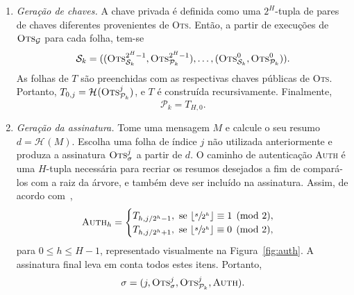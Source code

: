 \documentclass{ufsctex/ufsctex}
\newcommand{\pk}{\mathcal{P}_{k}}
\newcommand{\sk}{\mathcal{S}_{k}}
\newcommand{\hash}[2][]{\mathcal{H}^{#1} (#2)}
\begin{document}
\begin{enumerate}

  \item[] \emph{Geração de chaves.} A chave privada é definida como uma
      $2^{H}$-tupla de pares de chaves diferentes provenientes de \textsc{Ots}.
        Então, a partir de execuções de $\textsc{Ots}_\mathcal{G}$ para cada
        folha, tem-se
        \begin{equation}
          \sk{} = ((\textsc{Ots}_{\sk{}}^{2^{H} - 1},
            \textsc{Ots}_{\pk{}}^{2^{H} - 1}), \dots,
            (\textsc{Ots}_{\sk{}}^{0}, \textsc{Ots}_{\pk{}}^{0})).
        \end{equation}
        As folhas de $T$ são preenchidas com as respectivas chaves públicas de
        \textsc{Ots}. Portanto, $T_{0, j} = \hash{\textsc{Ots}_{\pk{}}^{j}}$, e
        $T$ é construída recursivamente. Finalmente,
        \begin{equation}
          \pk{} = T_{H, 0}.
        \end{equation}

  \item[] \emph{Geração da assinatura.} Tome uma mensagem $M$ e calcule o seu
      resumo $d = \hash{M}$. Escolha uma folha de índice $j$ não utilizada
        anteriormente e produza a assinatura $\textsc{Ots}_\sigma^{j}$ a partir
        de $d$. O caminho de autenticação \textsc{Auth} é uma $H$-tupla
        necessária para recriar os resumos desejados a fim de compará-los com a
        raiz da árvore, e também deve ser incluído na assinatura. Assim, de
        acordo com~\cite[pp. 43]{Bernstein:book:2008},
        \begin{equation}
          \textsc{Auth}_{h} =
          \begin{cases}
            T_{h, j / 2^{h}  - 1}, \text{ se }
              \lfloor \sfrac{s}{2^{h}} \rfloor \equiv 1 \pmod{2}, \\
            T_{h, j / 2^{h}  + 1}, \text{ se }
              \lfloor \sfrac{s}{2^{h}} \rfloor \equiv 0 \pmod{2},
          \end{cases}
        \end{equation}
        para $0 \leq h \leq H - 1$, representado visualmente na
        Figura~\ref{fig:auth}. A assinatura final leva em conta todos estes
        itens. Portanto,
        \begin{equation}
          \sigma = (j, \textsc{Ots}_\sigma^{j},
            \textsc{Ots}_{\pk{}}^{j}, \textsc{Auth}).
        \end{equation}


\end{enumerate}
\end{document}
